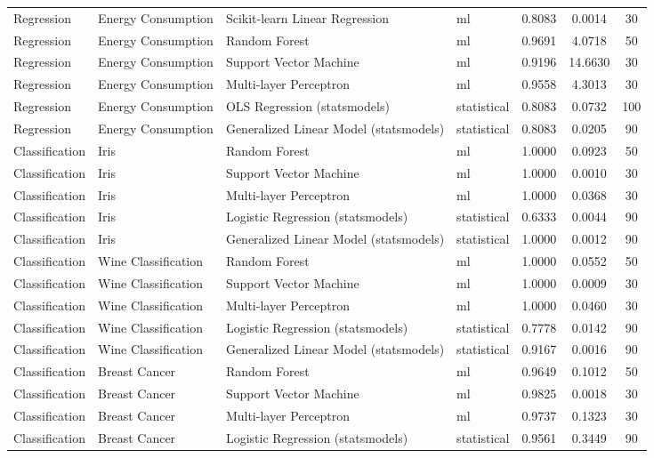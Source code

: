 \documentclass[11pt,a4paper]{article}
\begin{document}
\begin{table}[h!]
\begin{tabular}{llllccc}
Regression & Energy Consumption & Scikit-learn Linear Regression & ml & 0.8083 & 0.0014 & 30 \\
Regression & Energy Consumption & Random Forest & ml & 0.9691 & 4.0718 & 50 \\
Regression & Energy Consumption & Support Vector Machine & ml & 0.9196 & 14.6630 & 30 \\
Regression & Energy Consumption & Multi-layer Perceptron & ml & 0.9558 & 4.3013 & 30 \\
Regression & Energy Consumption & OLS Regression (statsmodels) & statistical & 0.8083 & 0.0732 & 100 \\
Regression & Energy Consumption & Generalized Linear Model (statsmodels) & statistical & 0.8083 & 0.0205 & 90 \\
Classification & Iris & Random Forest & ml & 1.0000 & 0.0923 & 50 \\
Classification & Iris & Support Vector Machine & ml & 1.0000 & 0.0010 & 30 \\
Classification & Iris & Multi-layer Perceptron & ml & 1.0000 & 0.0368 & 30 \\
Classification & Iris & Logistic Regression (statsmodels) & statistical & 0.6333 & 0.0044 & 90 \\
Classification & Iris & Generalized Linear Model (statsmodels) & statistical & 1.0000 & 0.0012 & 90 \\
Classification & Wine Classification & Random Forest & ml & 1.0000 & 0.0552 & 50 \\
Classification & Wine Classification & Support Vector Machine & ml & 1.0000 & 0.0009 & 30 \\
Classification & Wine Classification & Multi-layer Perceptron & ml & 1.0000 & 0.0460 & 30 \\
Classification & Wine Classification & Logistic Regression (statsmodels) & statistical & 0.7778 & 0.0142 & 90 \\
Classification & Wine Classification & Generalized Linear Model (statsmodels) & statistical & 0.9167 & 0.0016 & 90 \\
Classification & Breast Cancer & Random Forest & ml & 0.9649 & 0.1012 & 50 \\
Classification & Breast Cancer & Support Vector Machine & ml & 0.9825 & 0.0018 & 30 \\
Classification & Breast Cancer & Multi-layer Perceptron & ml & 0.9737 & 0.1323 & 30 \\
Classification & Breast Cancer & Logistic Regression (statsmodels) & statistical & 0.9561 & 0.3449 & 90 \\

\end{tabular}
\end{table}
\end{document}
